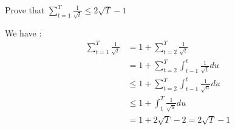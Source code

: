 \begin{exercise}[]{}
	Prove that $ \sum_{t=1}^{T}\frac{1}{\sqrt{t}} \leq 2\sqrt{T} -1 $
\end{exercise}

\begin{solution}[]
	We have :
\begin{align*}
	\sum_{t=1}^{T}\frac{1}{\sqrt{t}} &= 1 +\sum_{t=2}^{T}\frac{1}{\sqrt{t}}\\
					 &= 1 + \sum_{t=2}^{T} \int_{t-1}^{t} \frac{1}{\sqrt{t}}du \\
					 &\leq  1 + \sum_{t=2}^{T} \int_{t-1}^{t} \frac{1}{\sqrt{u}}du \\
					 &\leq 1+\int_{1}^{T} \frac{1}{\sqrt{u}}du \\
					 &= 1 + 2\sqrt{T} - 2 = 2\sqrt{T} - 1
\end{align*}

\end{solution}
